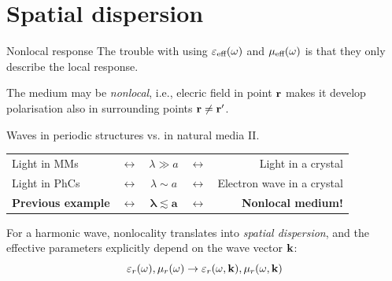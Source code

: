 \documentclass[t]{beamer} \usepackage[english]{babel} \usepackage[utf8]{inputenc} \usetheme{Frankfurt} %
\begin{document}
\section{Spatial dispersion}
\begin{frame}{Nonlocal response}%
The trouble with using $\varepsilon_{\text{eff} }(\omega)$ and $\mu_{\text{eff} }(\omega)$ is that they only describe the local response. \vspace{.5em}

The medium may be \textit{nonlocal}, i.e., elecric field in point ${\mathbf{r}}$ makes it develop polarisation also in surrounding points ${\mathbf{r}}\neq{\mathbf{r}}'$.
	
\begin{exampleblock}{Waves in periodic structures vs. in natural media II.}
\centering \begin{tabular}{lcccr}
Light in MMs    &$\leftrightarrow$  &$\lambda \gg a$ &$\leftrightarrow$ 	& Light in a crystal         	\\
Light in PhCs   &$\leftrightarrow$  &$\lambda \sim a$ &$\leftrightarrow$ 	& Electron wave in a crystal 	\\
	\textbf{Previous example}  &$\leftrightarrow$  &$\mathbf{\pmb{\lambda\lesssim a}}$ &$\leftrightarrow$ 	& \textbf{Nonlocal medium!}\\
\end{tabular}
\end{exampleblock}

For a harmonic wave, nonlocality translates into \textit{spatial dispersion}, and the effective parameters explicitly depend on the wave vector ${\mathbf{k}}$: 
$$\varepsilon_r(\omega), \mu_r(\omega) \rightarrow  \varepsilon_r(\omega,{\mathbf{k}}), \mu_r(\omega,{\mathbf{k}})$$
\end{frame} %
\end{document}
